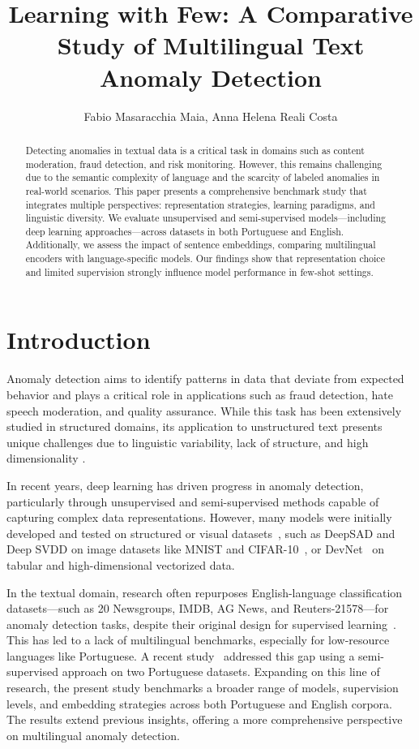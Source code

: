 \documentclass[12pt]{article}
\title{Learning with Few: A Comparative Study of Multilingual Text Anomaly Detection}
\author{Fabio Masaracchia Maia\inst{1}, Anna Helena Reali Costa\inst{1}}
\begin{document}
 

\maketitle

\begin{abstract}
Detecting anomalies in textual data is a critical task in domains such as content moderation, fraud detection, and risk monitoring. However, this remains challenging due to the semantic complexity of language and the scarcity of labeled anomalies in real-world scenarios. This paper presents a comprehensive benchmark study that integrates multiple perspectives: representation strategies, learning paradigms, and linguistic diversity. We evaluate unsupervised and semi-supervised models—including deep learning approaches—across datasets in both Portuguese and English. Additionally, we assess the impact of sentence embeddings, comparing multilingual encoders with language-specific models. Our findings show that representation choice and limited supervision strongly influence model performance in few-shot settings.
\end{abstract}

\section{Introduction}

Anomaly detection aims to identify patterns in data that deviate from expected behavior and plays a critical role in applications such as fraud detection, hate speech moderation, and quality assurance. While this task has been extensively studied in structured domains, its application to unstructured text presents unique challenges due to linguistic variability, lack of structure, and high dimensionality \cite{Chandola2009AnomalyDetection, pang2021deep}.

In recent years, deep learning has driven progress in anomaly detection, particularly through unsupervised and semi-supervised methods capable of capturing complex data representations. However, many models were initially developed and tested on structured or visual datasets~\cite{pang2021deep}, such as DeepSAD and Deep SVDD on image datasets like MNIST and CIFAR-10~\cite{Ruff2018, Ruff2019}, or DevNet~\cite{Pang2019} on tabular and high-dimensional vectorized data.

In the textual domain, research often repurposes English-language classification datasets—such as 20 Newsgroups, IMDB, AG News, and Reuters-21578—for anomaly detection tasks, despite their original design for supervised learning~\cite{ruff-etal-2019-self, manolache-etal-2021-date, xu-etal-2023-comparative}. This has led to a lack of multilingual benchmarks, especially for low-resource languages like Portuguese. A recent study~\cite{stil} addressed this gap using a semi-supervised approach on two Portuguese datasets. Expanding on this line of research, the present study benchmarks a broader range of models, supervision levels, and embedding strategies across both Portuguese and English corpora. The results extend previous insights, offering a more comprehensive perspective on multilingual anomaly detection.
\end{document}
